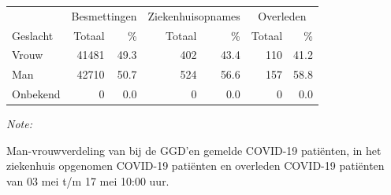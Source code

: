 \documentclass[
  english,
  man,floatsintext]{apa6}
\begin{document}
\begin{table}
\centering\begingroup\fontsize{11}{13}\selectfont

\begin{threeparttable}
\begin{tabular}{lrrrrrr}
\toprule
\multicolumn{1}{c}{ } & \multicolumn{2}{c}{Besmettingen} & \multicolumn{2}{c}{Ziekenhuisopnames} & \multicolumn{2}{c}{Overleden} \\
\cmidrule(l{3pt}r{3pt}){2-3} \cmidrule(l{3pt}r{3pt}){4-5} \cmidrule(l{3pt}r{3pt}){6-7}
Geslacht & Totaal & \% & Totaal & \% & Totaal & \%\\
\midrule
Vrouw & 41481 & 49.3 & 402 & 43.4 & 110 & 41.2\\
Man & 42710 & 50.7 & 524 & 56.6 & 157 & 58.8\\
Onbekend & 0 & 0.0 & 0 & 0.0 & 0 & 0.0\\
\bottomrule
\end{tabular}
\begin{tablenotes}
\item \textit{Note: } 
\item Man-vrouwverdeling van bij de GGD’en gemelde COVID-19 patiënten, in het ziekenhuis opgenomen COVID-19 patiënten en overleden COVID-19 patiënten van 03 mei t/m 17 mei 10:00 uur.
\end{tablenotes}
\end{threeparttable}
\endgroup{}
\end{table}
\newpage
\end{document}
